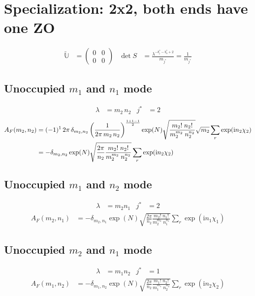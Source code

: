 \documentclass[
	english,
	a4paper,
	fontsize=10pt,
	parskip=half,
	titlepage=true,
	DIV=12,
	final
]{scrreprt}
\newcommand*{\iunit}{\ensuremath{\mathrm{i}}}
\begin{document}
\section{Specialization: 2x2, both ends have one ZO}
\begin{align}
	\tilde{\mathbb{U}}
&=
	\begin{pmatrix}
		0 & 0 \\ 0 & 0
	\end{pmatrix}
&
	\det S
&=
	\frac{ \lambda^{-b_i^* - b_o^* + 2} }{ m_{j^*} }
=
	\frac{1}{m_{j^*}}
\end{align}

\subsection{Unoccupied $m_1$ and $n_1$ mode}
\begin{align}
	\lambda &= m_2 \, n_2
&
	j^* &= 2
\end{align}
\begin{align}
	A_F(m_2, n_2)
&=
	(-1)^1 \, 2\pi \, \delta_{m_2,n_2} \, \qty(
		\frac{1}{2\pi \, m_2 \, n_2}
	)^{\frac{1 + 1 - 1}{2}}
	\exp(N)
	\sqrt{\frac
		{ m_2!      \; n_2! }
		{ m_2^{m_2} \; n_2^{n_2} }
	}
	\sqrt{m_2}
	\sum_r
		\exp( \iunit n_2 \chi_2 )
	\\
&=
	-\delta_{m_2,n_2}
	\exp(N)
	\sqrt{
		\frac
			{2\pi}
			{n_2}
		\frac
			{ m_2!      \; n_2! }
			{ m_2^{m_2} \; n_2^{n_2} }
	}
	\sum_r
		\exp( \iunit n_2 \chi_2 )
\end{align}

\subsection{Unoccupied $m_1$ and $n_2$ mode}
\begin{align}
	\lambda &= m_2 n_1
&
	j^* &= 2
\end{align}
\begin{align}
	A_F(m_2, n_1)
&=
	-\delta_{m_2,n_1}
	\exp(N)
	\sqrt{
		\frac
			{2\pi}
			{n_2}
		\frac
			{ m_2!      \; n_1! }
			{ m_2^{m_2} \; n_1^{n_1} }
	}
	\sum_r
		\exp( \iunit n_1 \chi_1 )
\end{align}

\subsection{Unoccupied $m_2$ and $n_1$ mode}
\begin{align}
	\lambda &= m_1 n_2
&
	j^* &= 1
\end{align}
\begin{align}
	A_F(m_1, n_2)
&=
	-\delta_{m_1,n_2}
	\exp(N)
	\sqrt{
		\frac
			{2\pi}
			{n_2}
		\frac
			{ m_1!      \; n_2! }
			{ m_1^{m_1} \; n_2^{n_2} }
	}
	\sum_r
		\exp( \iunit n_2 \chi_2 )
\end{align}
\end{document}
